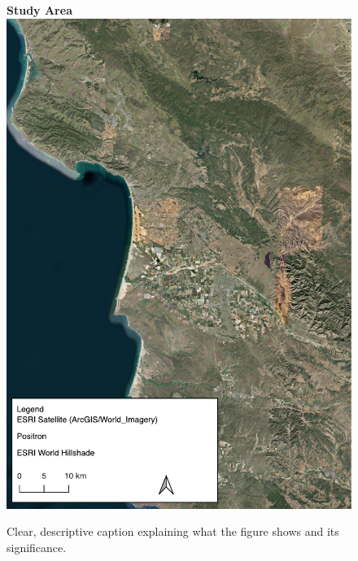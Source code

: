 \begin{figure}[htbp]
    \centering
    \textbf{Study Area}\\[1ex]
    \includegraphics[width=\textwidth]{figures/test.pdf}
    \caption{Clear, descriptive caption explaining what the figure shows and its significance.}
    \label{fig:your-label}
\end{figure}